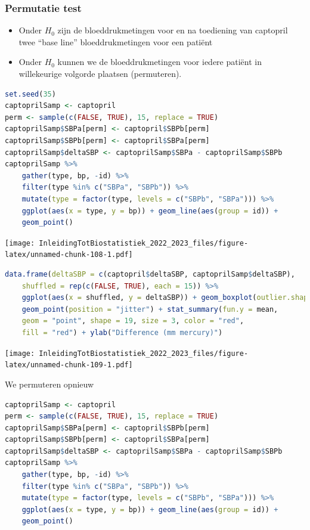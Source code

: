 \documentclass[
  12pt,dutch,coursenotes]{book}
\begin{document}
\hypertarget{permutatie-test}{%
\subsubsection{Permutatie test}\label{permutatie-test}}

\begin{itemize}
\item
  Onder \(H_0\) zijn de bloeddrukmetingen voor en na toediening van captopril twee ``base line'' bloeddrukmetingen voor een patiënt
\item
  Onder \(H_0\) kunnen we de bloeddrukmetingen voor iedere patiënt in willekeurige volgorde plaatsen (permuteren).
\end{itemize}

\begin{lstlisting}[language=R]
set.seed(35)
captoprilSamp <- captopril
perm <- sample(c(FALSE, TRUE), 15, replace = TRUE)
captoprilSamp$SBPa[perm] <- captopril$SBPb[perm]
captoprilSamp$SBPb[perm] <- captopril$SBPa[perm]
captoprilSamp$deltaSBP <- captoprilSamp$SBPa - captoprilSamp$SBPb
captoprilSamp %>%
    gather(type, bp, -id) %>%
    filter(type %in% c("SBPa", "SBPb")) %>%
    mutate(type = factor(type, levels = c("SBPb", "SBPa"))) %>%
    ggplot(aes(x = type, y = bp)) + geom_line(aes(group = id)) +
    geom_point()
\end{lstlisting}

\texttt{[image: InleidingTotBiostatistiek\_2022\_2023\_files/figure-latex/unnamed-chunk-108-1.pdf]}

\begin{lstlisting}[language=R]
data.frame(deltaSBP = c(captopril$deltaSBP, captoprilSamp$deltaSBP),
    shuffled = rep(c(FALSE, TRUE), each = 15)) %>%
    ggplot(aes(x = shuffled, y = deltaSBP)) + geom_boxplot(outlier.shape = NA) +
    geom_point(position = "jitter") + stat_summary(fun.y = mean,
    geom = "point", shape = 19, size = 3, color = "red",
    fill = "red") + ylab("Difference (mm mercury)")
\end{lstlisting}

\texttt{[image: InleidingTotBiostatistiek\_2022\_2023\_files/figure-latex/unnamed-chunk-109-1.pdf]}

We permuteren opnieuw

\begin{lstlisting}[language=R]
captoprilSamp <- captopril
perm <- sample(c(FALSE, TRUE), 15, replace = TRUE)
captoprilSamp$SBPa[perm] <- captopril$SBPb[perm]
captoprilSamp$SBPb[perm] <- captopril$SBPa[perm]
captoprilSamp$deltaSBP <- captoprilSamp$SBPa - captoprilSamp$SBPb
captoprilSamp %>%
    gather(type, bp, -id) %>%
    filter(type %in% c("SBPa", "SBPb")) %>%
    mutate(type = factor(type, levels = c("SBPb", "SBPa"))) %>%
    ggplot(aes(x = type, y = bp)) + geom_line(aes(group = id)) +
    geom_point()
\end{lstlisting}
\end{document}
